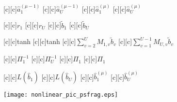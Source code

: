 \documentclass{article}
\begin{document}
\begin{figure}[htb]
  \begin{center}



        [c][c]{$\hat{a}_1^{(\mu-1)}$}
        [c][c]{$\hat{a}_U^{(\mu-1)}$}
        [c][c]{$\hat{a}_1^{(\mu)}$}
        [c][c]{$\hat{a}_U^{(\mu)}$}

        [c][c]{$r_1$}
        [c][c]{$r_U$}
        [c][c]{$\tilde{b}_1$}
        [c][c]{$\tilde{b}_U$}

        [c][c]{tanh}
        [c][c]{tanh}
        [c][c]{$\sum\limits_{v=2}^{U}M_{1,v}\tilde{b}_v$}
        [c][c]{$\sum\limits_{v=1}^{U-1}M_{U,v}\tilde{b}_v$}

        [c][c]{$\Pi_1^{-1}$}
        [c][c]{$\Pi_U^{-1}$}
        [c][c]{$\Pi_1$}
        [c][c]{$\Pi_1$}

        [c][c]{\footnotesize$L(\hat{b}_1)$}
        [c][c]{\footnotesize$L(\hat{b}_U)$}
        [c][c]{$\hat{b}_1^{(\mu)}$}
        [c][c]{$\hat{b}_U^{(\mu)}$}






    \texttt{[image: nonlinear\_pic\_psfrag.eps]}
    \end{center}
\end{figure}
\end{document}
